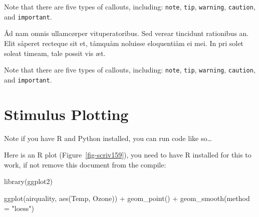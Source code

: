 \documentclass[
  12pt,
  a4paper,
  oneside,
  titlepage,
  toclink=all,
  toc=bibliography]{scrbook}
\newenvironment{Shaded}{\begin{snugshade}}{\end{snugshade}}
\newcommand{\AttributeTok}[1]{\textcolor[rgb]{0.40,0.45,0.13}{#1}}
\newcommand{\FunctionTok}[1]{\textcolor[rgb]{0.28,0.35,0.67}{#1}}
\newcommand{\NormalTok}[1]{\textcolor[rgb]{0.00,0.23,0.31}{#1}}
\newcommand{\SpecialCharTok}[1]{\textcolor[rgb]{0.37,0.37,0.37}{#1}}
\newcommand{\StringTok}[1]{\textcolor[rgb]{0.13,0.47,0.30}{#1}}
\theoremstyle{plain}
\theoremstyle{definition}
\theoremstyle{definition}
\theoremstyle{plain}
\theoremstyle{plain}
\theoremstyle{plain}
\theoremstyle{definition}
\theoremstyle{plain}
\theoremstyle{remark}
\begin{document}
\begin{tcolorbox}[enhanced jigsaw, breakable, opacitybacktitle=0.6, colframe=quarto-callout-important-color-frame, opacityback=0, arc=.35mm, left=2mm, bottomtitle=1mm, toptitle=1mm, toprule=.15mm, titlerule=0mm, coltitle=black, colbacktitle=quarto-callout-important-color!10!white, title=\textcolor{quarto-callout-important-color}{\faExclamation}\hspace{0.5em}{Important}, colback=white, rightrule=.15mm, bottomrule=.15mm, leftrule=.75mm]

Note that there are five types of callouts, including: \texttt{note},
\texttt{tip}, \texttt{warning}, \texttt{caution}, and
\texttt{important}.

\end{tcolorbox}

Åd nam omnis ullamcørper vituperatoribus. Sed verear tincidunt
rationibus an. Elit såperet recteque sit et, tåmquåm noluisse
eloquentiåm ei mei. In pri solet soleat timeam, tale possit vis æt.

\begin{tcolorbox}[enhanced jigsaw, breakable, opacitybacktitle=0.6, colframe=quarto-callout-note-color-frame, opacityback=0, arc=.35mm, left=2mm, bottomtitle=1mm, toptitle=1mm, toprule=.15mm, titlerule=0mm, coltitle=black, colbacktitle=quarto-callout-note-color!10!white, title=\textcolor{quarto-callout-note-color}{\faInfo}\hspace{0.5em}{Note}, colback=white, rightrule=.15mm, bottomrule=.15mm, leftrule=.75mm]

Note that there are five types of callouts, including: \texttt{note},
\texttt{tip}, \texttt{warning}, \texttt{caution}, and
\texttt{important}.

\end{tcolorbox}

\hypertarget{sec-scriv159}{%
\section{Stimulus Plotting}\label{sec-scriv159}}

\protect\hypertarget{scriv159}{}{}

Note if you have R and Python installed, you can run code like
so\ldots{}

Here is an R plot
(\protect\hypertarget{cite_20}{}{\label{cite_20}Figure~\ref{fig-scriv159}}),
you need to have R installed for this to work, if not remove this
document from the compile:

\begin{Shaded}
\begin{Highlighting}[numbers=left,,]
\FunctionTok{library}\NormalTok{(ggplot2)}

\FunctionTok{ggplot}\NormalTok{(airquality, }\FunctionTok{aes}\NormalTok{(Temp, Ozone)) }\SpecialCharTok{+} 
  \FunctionTok{geom\_point}\NormalTok{() }\SpecialCharTok{+} 
  \FunctionTok{geom\_smooth}\NormalTok{(}\AttributeTok{method =} \StringTok{"loess"}\NormalTok{)}
\end{Highlighting}
\end{Shaded}
\end{document}
